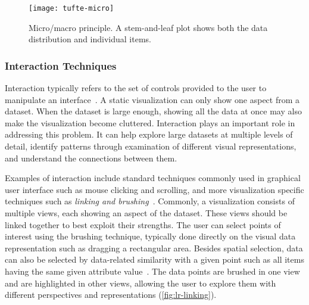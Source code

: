 \begin{figure}
	\centering
	\texttt{[image: tufte-micro]}
	\caption[Micro/macro principle]{Micro/macro principle. A stem-and-leaf plot shows both the data distribution and individual items. }
	\label{fig:lr-tufte-micro}
\end{figure}



\subsubsection{Interaction Techniques}
Interaction typically refers to the set of controls provided to the user to manipulate an interface~\cite{Pike2009a}. A static visualization can only show one aspect from a dataset. When the dataset is large enough, showing all the data at once may also make the visualization become cluttered. Interaction plays an important role in addressing this problem. It can help explore large datasets at multiple levels of detail, identify patterns through examination of different visual representations, and understand the connections between them.

Examples of interaction include standard techniques commonly used in graphical user interface such as mouse clicking and scrolling, and more visualization specific techniques such as \emph{linking and brushing}~\cite{Kosara2003}. Commonly, a visualization consists of multiple views, each showing an aspect of the dataset. These views should be linked together to best exploit their strengths. The user can select points of interest using the brushing technique, typically done directly on the visual data representation such as dragging a rectangular area. Besides spatial selection, data can also be selected by data-related similarity with a given point such as all items having the same given attribute value~\cite{Heer2008a}. The data points are brushed in one view and are highlighted in other views, allowing the user to explore them with different perspectives and representations (\autoref{fig:lr-linking}).

